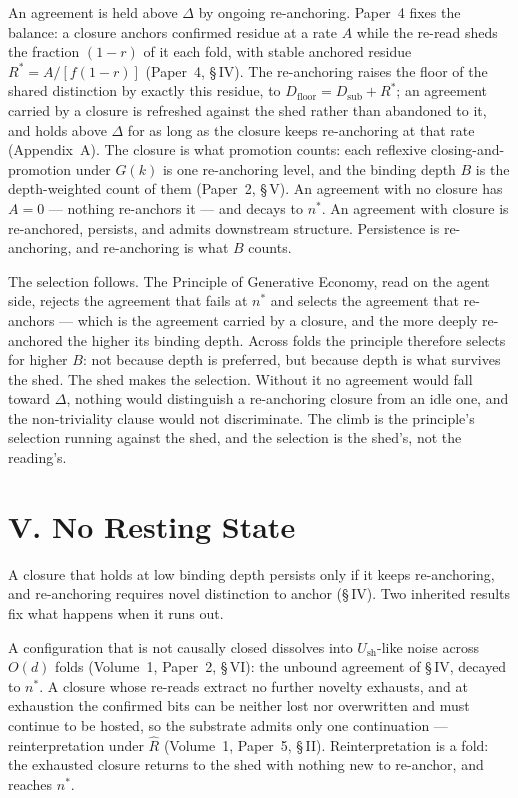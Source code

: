 \documentclass[11pt,oneside]{report}
\theoremstyle{definition}
\theoremstyle{remark}
\begin{document}
An agreement is held above \ensuremath{\Delta} by ongoing re-anchoring. Paper~4
fixes the balance: a closure anchors
confirmed residue at a rate \ensuremath{A} while the re-read sheds the fraction
\ensuremath{(1-r)} of it each fold, with stable anchored residue
\ensuremath{R^{*} = A/[f(1-r)]} (Paper~4, \S\,IV). The re-anchoring raises the floor of
the shared distinction by exactly this residue, to \ensuremath{D_{\mathrm{floor}} =
D_{\mathrm{sub}} + R^{*}}; an agreement carried by a closure is refreshed against the
shed rather than abandoned to it, and holds above \ensuremath{\Delta} for as long as
the closure keeps re-anchoring at that rate (Appendix~A). The closure is what promotion
counts: each reflexive closing-and-promotion under \ensuremath{G(k)} is one
re-anchoring level, and the binding depth \ensuremath{B} is the depth-weighted count
of them (Paper~2, \S\,V). An agreement with no closure has \ensuremath{A = 0} ---
nothing re-anchors it --- and decays to \ensuremath{n^{*}}. An agreement with closure
is re-anchored, persists, and admits downstream structure. Persistence is
re-anchoring, and re-anchoring is what \ensuremath{B} counts.

The selection follows. The Principle of Generative Economy, read on the agent side,
rejects the agreement that fails at \ensuremath{n^{*}} and selects the agreement that
re-anchors --- which is the agreement carried by a closure, and the more deeply
re-anchored the higher its binding depth. Across folds the principle therefore selects
for higher \ensuremath{B}: not because depth is preferred, but because depth is what
survives the shed. The shed makes the selection. Without it no agreement would fall
toward \ensuremath{\Delta}, nothing would distinguish a re-anchoring closure from an
idle one, and the non-triviality clause would not discriminate. The climb is the
principle's selection running against the shed, and the selection is the shed's, not
the reading's.


\section*{V. No Resting State}

A closure that holds at low binding depth persists only if it keeps re-anchoring, and
re-anchoring requires novel distinction to anchor (\S\,IV). Two inherited results fix
what happens when it runs out.

A configuration that is not causally closed dissolves into \ensuremath{U_{\mathrm{sh}}}-like
noise across \ensuremath{O(d)} folds (Volume~1, Paper~2, \S\,VI): the unbound agreement
of \S\,IV, decayed to \ensuremath{n^{*}}. A closure whose re-reads extract no further
novelty exhausts, and at exhaustion the confirmed bits can be neither lost nor
overwritten and must continue to be hosted, so the substrate admits only one
continuation --- reinterpretation under \ensuremath{\hat{R}} (Volume~1, Paper~5,
\S\,II). Reinterpretation is a fold: the exhausted closure returns to the shed with
nothing new to re-anchor, and reaches \ensuremath{n^{*}}.
\end{document}

